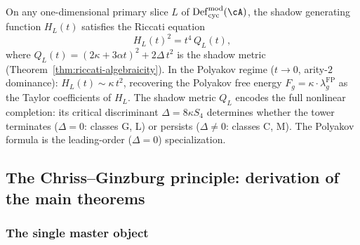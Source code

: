 \begin{proposition}
\label{prop:riccati-polyakov}
On any one-dimensional primary slice $L$ of $\mathrm{Def}_{\mathrm{cyc}}^{\mathrm{mod}}(\cA)$, the shadow generating function $H_L(t)$ satisfies the Riccati equation
\[
H_L(t)^2 = t^4\,Q_L(t),
\]
where $Q_L(t) = (2\kappa + 3\alpha t)^2 + 2\Delta\,t^2$ is the shadow metric \textup{(}Theorem~\textup{\ref{thm:riccati-algebraicity})}.  In the Polyakov regime ($t \to 0$, arity-$2$ dominance): $H_L(t) \sim \kappa\,t^2$, recovering the Polyakov free energy $F_g = \kappa \cdot \lambda_g^{\mathrm{FP}}$ as the Taylor coefficients of $H_L$.  The shadow metric $Q_L$ encodes the full nonlinear completion: its critical discriminant $\Delta = 8\kappa S_4$ determines whether the tower terminates ($\Delta = 0$: classes G, L) or persists ($\Delta \neq 0$: classes C, M).  The Polyakov formula is the leading-order ($\Delta = 0$) specialization.
\end{proposition}


\subsection{The Chriss--Ginzburg principle: derivation of the main theorems}
\label{subsec:chriss-ginzburg-derivation}


\subsubsection{The single master object}

